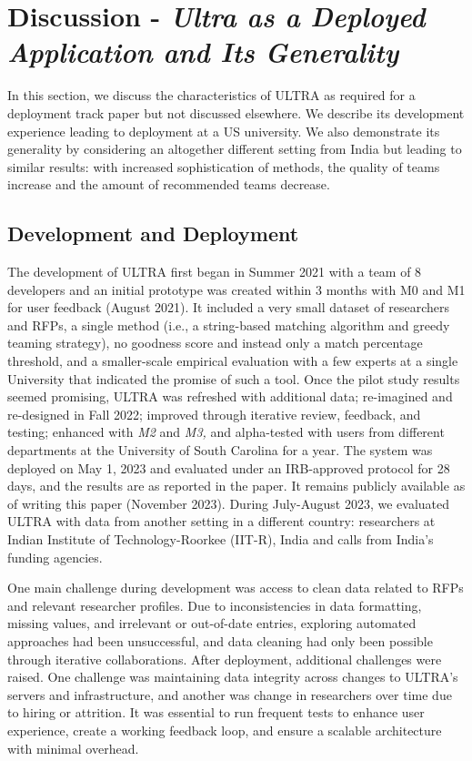 \section{Discussion - \textit{Ultra as a Deployed Application and Its Generality}}
In this section, we discuss the characteristics of ULTRA as required for a deployment track paper but not discussed elsewhere. We describe its development experience leading to deployment at a US university. We also demonstrate its generality by considering an altogether different setting from India but leading to similar results: with increased sophistication of methods, the quality of teams increase and the amount of recommended teams decrease. 

\subsection{Development and Deployment}
The development of ULTRA first began in Summer 2021 with a team of 8 developers and an initial prototype was created within 3 months with M0 and M1 for user feedback (August 2021). It included a very small dataset of researchers and RFPs, a single method (i.e., a string-based matching algorithm and greedy teaming strategy), no goodness score and instead only a match percentage threshold, and a smaller-scale empirical evaluation with a few experts at a single University that indicated the promise of such a tool. Once the pilot study results seemed promising, ULTRA was refreshed with additional data; re-imagined and re-designed in Fall 2022; improved through iterative review, feedback, and testing; enhanced with \textit{M2} and \textit{M3,} and alpha-tested with users from different departments at the University of South Carolina for a year. The system was deployed on May 1, 2023 and evaluated under an IRB-approved protocol for 28 days, and the results are as reported in the paper. It remains publicly available as of writing this paper (November 2023). %
During July-August 2023, we evaluated ULTRA with data from another setting in a different country: researchers at Indian Institute of Technology-Roorkee (IIT-R), India and calls from India's funding agencies.   

One main challenge during development was access to clean data related to RFPs and relevant researcher profiles. Due to inconsistencies in data formatting, missing values, and irrelevant or out-of-date entries, exploring automated approaches had been unsuccessful, and data cleaning had  only been possible through iterative collaborations. 
After deployment, additional challenges were raised. One challenge was maintaining data integrity across changes to ULTRA's servers and infrastructure, and another was change in researchers over time due to hiring or attrition. It was essential to run frequent tests to enhance user experience, create a working feedback loop, and ensure a scalable architecture with minimal overhead. 

